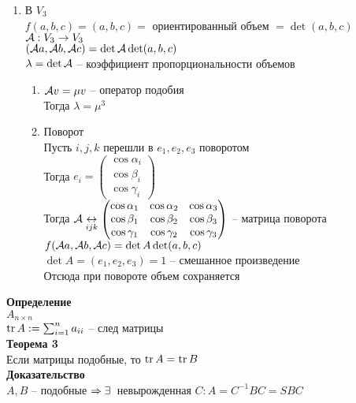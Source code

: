 \documentclass[12pt]{article}
\begin{document}
\begin{enumerate}
    \item В $V_3$\\
    $f(a,b,c) = (a, b, c) =$ ориентированный объем $= \det(a,b,c)$\\
    $\mathcal{A}: V_3 \rightarrow V_3$\\
    $(\mathcal{A} a, \mathcal{A} b, \mathcal{A} c) = \det \mathcal{A} \det (a,b,c)$\\
    $\lambda = \det \mathcal{A}$ -- коэффициент пропорциональности объемов
    \begin{enumerate}
        \item $\mathcal{A} v = \mu v$ -- оператор подобия\\
        Тогда $\lambda = \mu^3$
        \item Поворот\\
        Пусть $i,j,k$ перешли в $e_1, e_2, e_3$ поворотом\\
        Тогда $e_i = \begin{pmatrix}
            \cos \alpha_i\\
            \cos \beta_i\\
            \cos \gamma_i
        \end{pmatrix}$\\
        Тогда $\mathcal{A} \underset{ijk}{\leftrightarrow}\begin{pmatrix}
            \cos \alpha_1 & \cos \alpha_2 & \cos \alpha_3\\
            \cos \beta_1 & \cos \beta_2 & \cos \beta_3\\
            \cos \gamma_1 & \cos \gamma_2 & \cos \gamma_3
        \end{pmatrix}$ -- матрица поворота\\
        $f(\mathcal{A} a, \mathcal{A} b, \mathcal{A} c) = \det A \det (a,b,c)$\\
        $\det A = (e_1, e_2, e_3) = 1$ -- смешанное произведение\\
        Отсюда при повороте объем сохраняется
    \end{enumerate}
\end{enumerate}
\textbf{Определение}\\
$A_{n\times n}$\\
$\operatorname{tr} A := \sum_{i=1}^n a_{ii}$ -- след матрицы\\
\textbf{Теорема 3}\\
Если матрицы подобные, то $\operatorname{tr} A = \operatorname{tr} B$\\
\textbf{Доказательство}\\
$A, B$ -- подобные $\Rightarrow \exists\,$ невырожденная $C: A=C^{-1}BC=SBC$\\
\end{document}
